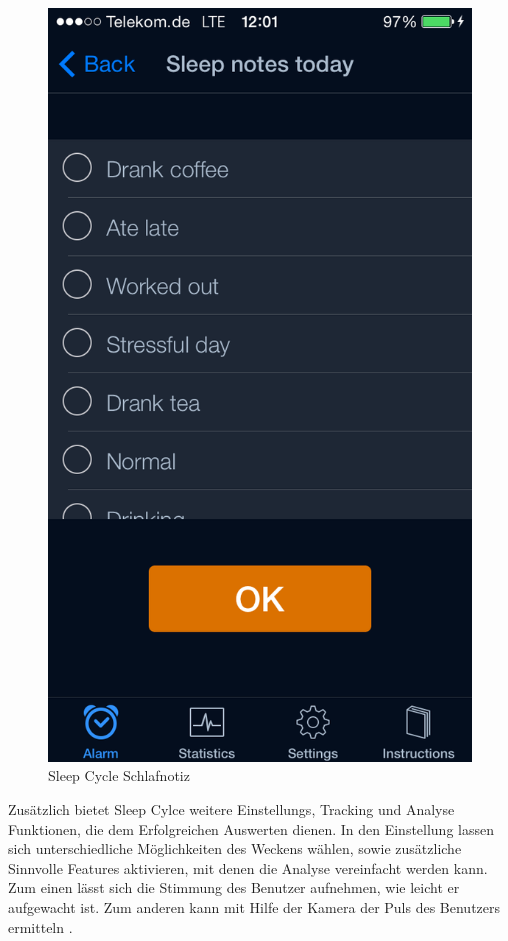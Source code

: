\begin{figure}[H]
\begin{minipage}[t]{0.47\textwidth}
    \includegraphics[scale=0.3]{images/SleepCycle/SleepNotesToday}  
    \caption{Sleep Cycle Schlafnotiz \cite{fig:SCSleepNoteToday}}
    \label{fig:SCSleepNoteToday}
  \end{minipage}
\end{figure}

Zusätzlich bietet Sleep Cylce weitere Einstellungs, Tracking und Analyse Funktionen, die dem Erfolgreichen Auswerten dienen.
In den Einstellung lassen sich unterschiedliche Möglichkeiten des Weckens wählen, sowie zusätzliche Sinnvolle Features aktivieren, mit denen die Analyse vereinfacht werden kann.
Zum einen lässt sich die Stimmung des Benutzer aufnehmen, wie leicht er aufgewacht ist.
Zum anderen kann mit Hilfe der Kamera der Puls des Benutzers ermitteln \cite{web:Pulsmessen}.

